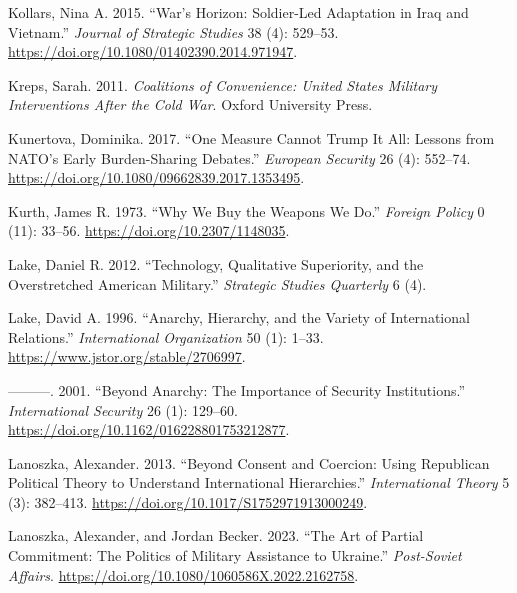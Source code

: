 \documentclass[
  12,
  letterpaper,
  DIV=11,
  numbers=noendperiod]{scrartcl}
\newlength{\cslhangindent}
\newlength{\cslentryspacingunit} %
\newenvironment{CSLReferences}[2] %
 {%
  \setlength{\parindent}{0pt}
  \ifodd #1
  \let\oldpar\par
  \def\par{\hangindent=\cslhangindent\oldpar}
  \fi
  \setlength{\parskip}{#2\cslentryspacingunit}
 }%
 {}
\begin{document}
\begin{CSLReferences}{1}{0}
\leavevmode{}%
Kollars, Nina A. 2015. {``War's {Horizon}: {Soldier-Led Adaptation} in
{Iraq} and {Vietnam}.''} \emph{Journal of Strategic Studies} 38 (4):
529--53. \url{https://doi.org/10.1080/01402390.2014.971947}.

\leavevmode{}%
Kreps, Sarah. 2011. \emph{Coalitions of {Convenience}: {United States
Military Interventions} After the {Cold War}}. {Oxford University
Press}.

\leavevmode{}%
Kunertova, Dominika. 2017. {``One Measure Cannot Trump It All: Lessons
from {NATO}'s Early Burden-Sharing Debates.''} \emph{European Security}
26 (4): 552--74. \url{https://doi.org/10.1080/09662839.2017.1353495}.

\leavevmode{}%
Kurth, James R. 1973. {``Why {We Buy} the {Weapons We Do}.''}
\emph{Foreign Policy} 0 (11): 33--56.
\url{https://doi.org/10.2307/1148035}.

\leavevmode{}%
Lake, Daniel R. 2012. {``Technology, {Qualitative Superiority}, and the
{Overstretched American Military}.''} \emph{Strategic Studies Quarterly}
6 (4).

\leavevmode{}%
Lake, David A. 1996. {``Anarchy, {Hierarchy}, and the {Variety} of
{International Relations}.''} \emph{International Organization} 50 (1):
1--33. \url{https://www.jstor.org/stable/2706997}.

\leavevmode{}%
---------. 2001. {``Beyond {Anarchy}: {The Importance} of {Security
Institutions}.''} \emph{International Security} 26 (1): 129--60.
\url{https://doi.org/10.1162/016228801753212877}.

\leavevmode{}%
Lanoszka, Alexander. 2013. {``Beyond Consent and Coercion: Using
Republican Political Theory to Understand International Hierarchies.''}
\emph{International Theory} 5 (3): 382--413.
\url{https://doi.org/10.1017/S1752971913000249}.

\leavevmode{}%
Lanoszka, Alexander, and Jordan Becker. 2023. {``The Art of Partial
Commitment: The Politics of Military Assistance to {Ukraine}.''}
\emph{Post-Soviet Affairs}.
\url{https://doi.org/10.1080/1060586X.2022.2162758}.


\end{CSLReferences}
\end{document}
